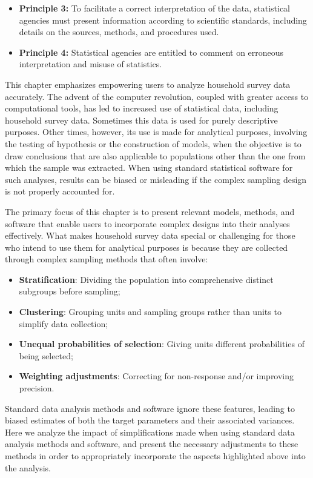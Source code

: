 \documentclass[
  12pt,
]{book}
\providecommand{\tightlist}{%
  \setlength{\itemsep}{0pt}\setlength{\parskip}{0pt}}
\begin{document}
\begin{itemize}
\tightlist
\item
  \textbf{Principle 3:} To facilitate a correct interpretation of the data, statistical agencies must present information according to scientific standards, including details on the sources, methods, and procedures used.
\item
  \textbf{Principle 4:} Statistical agencies are entitled to comment on erroneous interpretation and misuse of statistics.
\end{itemize}

This chapter emphasizes empowering users to analyze household survey data accurately. The advent of the computer revolution, coupled with greater access to computational tools, has led to increased use of statistical data, including household survey data. Sometimes this data is used for purely descriptive purposes. Other times, however, its use is made for analytical purposes, involving the testing of hypothesis or the construction of models, when the objective is to draw conclusions that are also applicable to populations other than the one from which the sample was extracted. When using standard statistical software for such analyses, results can be biased or misleading if the complex sampling design is not properly accounted for.

The primary focus of this chapter is to present relevant models, methods, and software that enable users to incorporate complex designs into their analyses effectively. What makes household survey data special or challenging for those who intend to use them for analytical purposes is because they are collected through complex sampling methods that often involve:

\begin{itemize}
\tightlist
\item
  \textbf{Stratification}: Dividing the population into comprehensive distinct subgroups before sampling;
\item
  \textbf{Clustering}: Grouping units and sampling groups rather than units to simplify data collection;
\item
  \textbf{Unequal probabilities of selection}: Giving units different probabilities of being selected;
\item
  \textbf{Weighting adjustments}: Correcting for non-response and/or improving precision.
\end{itemize}

Standard data analysis methods and software ignore these features, leading to biased estimates of both the target parameters and their associated variances. Here we analyze the impact of simplifications made when using standard data analysis methods and software, and present the necessary adjustments to these methods in order to appropriately incorporate the aspects highlighted above into the analysis.
\end{document}
